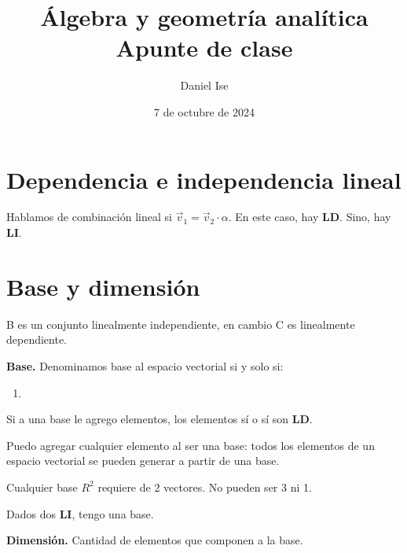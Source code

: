 \documentclass[12pt]{article}
\title{Álgebra y geometría analítica\\Apunte de clase}
\author{Daniel Ise}
\date{7 de octubre de 2024}
\begin{document}
\maketitle

\tableofcontents

\section{Dependencia e independencia lineal}

Hablamos de combinación lineal si \(\vec{v}_{1} = \vec{v}_{2}\cdot \alpha\).
En este caso, hay \textbf{LD}. Sino, hay \textbf{LI}.

\section{Base y dimensión}

B es un conjunto linealmente independiente, en cambio C es linealmente 
dependiente.

\textbf{Base.} Denominamos base al espacio vectorial si y solo si:
\begin{enumerate}
    \item 
\end{enumerate}

Si a una base le agrego elementos, 
los elementos sí o sí son \textbf{LD}.

Puedo agregar cualquier elemento al ser una base: todos los elementos de un 
espacio vectorial se pueden generar a partir de una base. 

Cualquier base \(R^{2}\) requiere de 2 vectores. 
No pueden ser 3 ni 1.

Dados dos \textbf{LI}, tengo una base.

\textbf{Dimensión.} 
Cantidad de elementos que componen a la base.
\end{document}
